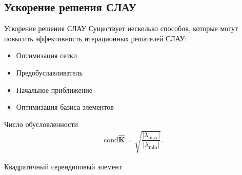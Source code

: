 \subsection{Ускорение решения СЛАУ}
\begin{frame}{Ускорение решения СЛАУ}
	\justifying
	Существует несколько способов, которые могут повысить эффективность итерационных решателей СЛАУ:
	
	\begin{minipage}{0.49\textwidth}
		\begin{itemize}
			\item Оптимизация сетки
			\item Предобуславливатель
			\item Начальное приближение
			\item Оптимизация базиса элементов
		\end{itemize}
		
		Число обусловленности
		\begin{gather*}
			\text{cond} \widehat{\textbf{K}} = \sqrt{\dfrac{|\lambda_{\max}|}{|\lambda_{\min}|}}.
		\end{gather*}
	\end{minipage}
	\hfill
	\begin{minipage}{0.5\textwidth}
		Квадратичный серендиповый элемент
	\end{minipage}
\end{frame}

